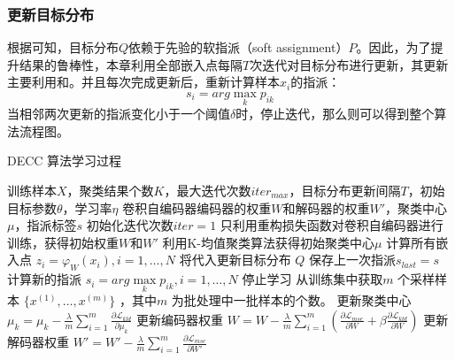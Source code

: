 \subsubsection{更新目标分布}
根据可知，目标分布$Q$依赖于先验的软指派（soft assignment）$P$。因此，为了提升结果的鲁棒性，本章利用全部嵌入点每隔$T$次迭代对目标分布进行更新，其更新主要利用和。并且每次完成更新后，重新计算样本$x_i$的指派：
\begin{equation}
	s_i=arg \max \limits_k p_{ik}
	\label{equ:assign}
\end{equation}
当相邻两次更新的指派变化小于一个阈值$\delta$时，停止迭代，那么则可以得到整个算法流程图。
\\[420pt]
\begin{algorithm}[H]
	\caption{DECC 算法学习过程}
	\begin{algorithmic}[1] %
		\Require 训练样本$X$，聚类结果个数$K$，最大迭代次数$iter_{max}$，目标分布更新间隔$T$，初始目标参数$\theta$，学习率$\eta$
		\Ensure 卷积自编码器编码器的权重$W$和解码器的权重$W'$，聚类中心$\mu$，指派标签$s$
		\State 初始化迭代次数$iter=1$
		\State 只利用重构损失函数对卷积自编码器进行训练，获得初始权重$W$和$W'$
		\State 利用K-均值聚类算法获得初始聚类中心$\mu$
				\State 计算所有嵌入点 $z_i=\varphi_W(x_i),i=1,\dots,N$
				\State 将代入更新目标分布 $Q$
				\State 保存上一次指派$s_{last}=s$
				\State 计算新的指派 $s_i=arg \max \limits_k p_{ik}, i= 1,\dots,N$
					\State 停止学习
				\EndIf
			\EndIf
			\State 从训练集中获取$m$ 个采样样本 $\{x^{(1)},\dots,x^{(m)}\}$ ，其中$m$ 为批处理中一批样本的个数。
			\State 更新聚类中心$\mu_k=\mu_k-\frac{\lambda}{m}\sum_{i=1}^m{\frac{\partial \mathscr{L}_{kld}}{\partial \mu_k}}$
			\State 更新编码器权重 $W=W-\frac{\lambda}{m}\sum_{i=1}^m(\frac{\partial \mathscr{L}_{mse}}{\partial W} + \beta \frac{\partial \mathscr{L}_{kld}}{\partial W})$
			\State 更新解码器权重 $W'=W'-\frac{\lambda}{m}\sum_{i=1}^m{\frac{\partial \mathscr{L}_{mse}}{\partial W'}}$
		\EndWhile
	\end{algorithmic}
\end{algorithm}


